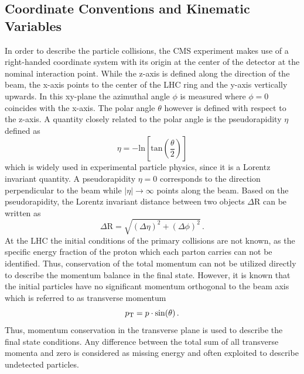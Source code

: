\subsection{Coordinate Conventions and Kinematic Variables}
\label{subsec:cms_coordinates}
In order to describe the particle collisions, the CMS experiment makes use of a right-handed coordinate system with its origin at the center of the detector at the nominal interaction point. While the z-axis is defined along the direction of the beam, the x-axis points to the center of the LHC ring and the y-axis vertically upwards. In this xy-plane the azimuthal angle $\phi$ is measured where $\phi = 0$ coincides with the x-axis. The polar angle $\theta$ however is defined with respect to the z-axis. A quantity closely related to the polar angle is the pseudorapidity $\eta$ defined as
\begin{equation}
\eta = \mathrm{-ln} \left[\mathrm{tan} \left(\frac{\theta}{2} \right)\right]
\end{equation}
which is widely used in experimental particle physics, since it is a Lorentz invariant quantity. A pseudorapidity $\eta = 0$ corresponds to the direction perpendicular to the beam while $|\eta| \rightarrow \infty$ points along the beam. Based on the pseudorapidity, the Lorentz invariant distance between two objects $\Delta$R can be written as
\begin{equation}
\Delta \mathrm{R} = \sqrt{(\Delta \eta)^2 + (\Delta \phi)^2} \, .
\end{equation}
At the LHC the initial conditions of the primary collisions are not known, as the specific energy fraction of the proton which each parton carries can not be identified. Thus, conservation of the total momentum can not be utilized directly to describe the momentum balance in the final state. However, it is known that the initial particles have no significant momentum orthogonal to the beam axis which is referred to as transverse momentum 
\begin{equation}
p_{\text{T}} = p \cdot \mathrm{sin}(\theta) \, .
\end{equation}
Thus, momentum conservation in the transverse plane is used to describe the final state conditions. Any difference between the total sum of all transverse momenta and zero is considered as missing energy \met and often exploited to describe undetected particles.

